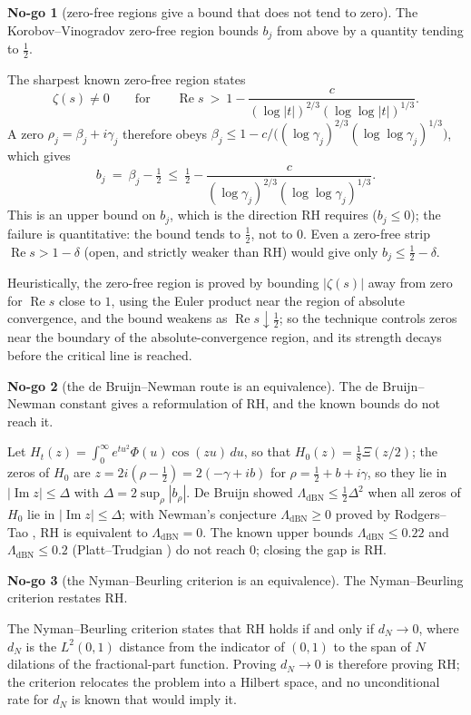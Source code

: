 \documentclass[11pt]{amsart}
\theoremstyle{definition}
\theoremstyle{remark}
\theoremstyle{definition}
\newtheorem{nogo}{No-go}[section]
\renewcommand{\Re}{\operatorname{Re}}
\renewcommand{\Im}{\operatorname{Im}}
\begin{document}
\begin{nogo}[zero-free regions give a bound that does not tend to zero]\label{ng:kv}
The Korobov--Vinogradov zero-free region bounds $b_j$ from above by a quantity tending to $\tfrac12$.
\end{nogo}
\noindent The sharpest known zero-free region \cite{Korobov,MTY} states
\[
   \zeta(s)\ne0\qquad\text{for}\qquad \Re s\ >\ 1-\frac{c}{(\log|t|)^{2/3}(\log\log|t|)^{1/3}} .
\]
A zero $\rho_j=\beta_j+i\gamma_j$ therefore obeys
$\beta_j\le1-c/\bigl((\log\gamma_j)^{2/3}(\log\log\gamma_j)^{1/3}\bigr)$, which gives
\[
   b_j\ =\ \beta_j-\tfrac12\ \le\ \tfrac12-\frac{c}{(\log\gamma_j)^{2/3}(\log\log\gamma_j)^{1/3}} .
\]
This is an upper bound on $b_j$, which is the direction RH requires ($b_j\le0$); the failure is
quantitative: the bound tends to $\tfrac12$, not to $0$. Even a zero-free strip $\Re s>1-\delta$ (open,
and strictly weaker than RH) would give only $b_j\le\tfrac12-\delta$.

Heuristically, the zero-free region is proved by bounding $|\zeta(s)|$ away from zero for $\Re s$ close
to $1$, using the Euler product near the region of absolute convergence, and the bound weakens as
$\Re s\downarrow\tfrac12$; so the technique controls zeros near the boundary of the absolute-convergence
region, and its strength decays before the critical line is reached.

\begin{nogo}[the de Bruijn--Newman route is an equivalence]\label{ng:dbn}
The de Bruijn--Newman constant gives a reformulation of RH, and the known bounds do not reach it.
\end{nogo}
\noindent Let $H_t(z)=\int_0^\infty e^{tu^2}\Phi(u)\cos(zu)\,du$, so that $H_0(z)=\tfrac18\Xi(z/2)$; the
zeros of $H_0$ are $z=2i(\rho-\tfrac12)=2(-\gamma+ib)$ for $\rho=\tfrac12+b+i\gamma$, so they lie in $|\Im z|\le\Delta$ with
$\Delta=2\sup_\rho|b_\rho|$. De Bruijn \cite{deBruijn} showed $\Lambda_{\mathrm{dBN}}\le\frac12\Delta^2$
when all zeros of $H_0$ lie in $|\Im z|\le\Delta$; with Newman's conjecture $\Lambda_{\mathrm{dBN}}\ge0$
\cite{Newman} proved by Rodgers--Tao \cite{RodgersTao}, RH is equivalent to $\Lambda_{\mathrm{dBN}}=0$.
The known upper bounds $\Lambda_{\mathrm{dBN}}\le0.22$ \cite{PolymathDBN} and $\Lambda_{\mathrm{dBN}}\le0.2$
(Platt--Trudgian \cite{PlattTrudgian}) do not reach $0$; closing the gap is RH.

\begin{nogo}[the Nyman--Beurling criterion is an equivalence]\label{ng:nb}
The Nyman--Beurling criterion restates RH.
\end{nogo}
\noindent The Nyman--Beurling criterion \cite{Beurling,BaezDuarte} states that RH holds if and only if
$d_N\to0$, where $d_N$ is the $L^2(0,1)$ distance from the indicator of $(0,1)$ to the span of $N$
dilations of the fractional-part function. Proving $d_N\to0$ is therefore proving RH; the criterion
relocates the problem into a Hilbert space, and no unconditional rate for $d_N$ is known that would imply it.
\end{document}

